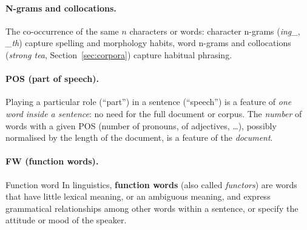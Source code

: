 \paragraph{N-grams and collocations.}
The co-occurrence of the same $n$ characters or words: character n-grams (\emph{ing\_},
\emph{\_th}) capture spelling and morphology habits, word n-grams and collocations
(\emph{strong tea}, Section~\ref{sec:corpora}) capture habitual phrasing.

\paragraph{POS (part of speech).}
Playing a particular role (``part'') in a sentence (``speech'') is a feature of
\emph{one word inside a sentence}: no need for the full document or corpus. The
\emph{number} of words with a given POS (number of pronouns, of adjectives, \ldots),
possibly normalised by the length of the document, is a feature of the
\emph{document}.

\paragraph{FW (function words).}

\begin{nbdef}{Function word}
In linguistics, \textbf{function words} (also called \emph{functors}) are words that
have little lexical meaning, or an ambiguous meaning, and express grammatical
relationships among other words within a sentence, or specify the attitude or mood of
the speaker.
\end{nbdef}

